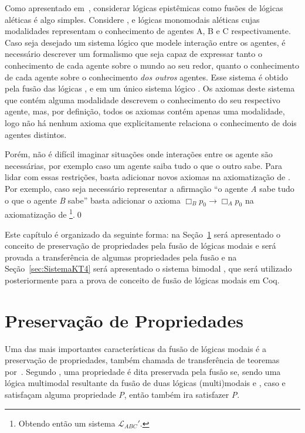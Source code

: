     \begin{exemplo}
        Como apresentado em~, considerar lógicas epistêmicas como fusões de lógicas aléticas é algo simples. Considere
        ,  e  lógicas monomodais aléticas cujas modalidades representam o conhecimento de agentes
        A, B e C respectivamente. Caso seja desejado um sistema lógico que modele interação entre os agentes, é necessário descrever um
        formalismo que seja capaz de expressar tanto o conhecimento de cada agente sobre o mundo ao seu redor, quanto o conhecimento de cada
        agente sobre o conhecimento \textit{dos outros} agentes. Esse sistema é obtido pela fusão das lógicas , 
        e  em um único sistema lógico . Os axiomas deste sistema que contém alguma modalidade descrevem o
        conhecimento do seu respectivo agente, mas, por definição, todos os axiomas contém apenas uma modalidade, logo não há nenhum
        axioma que explicitamente relaciona o conhecimento de dois agentes distintos.

        Porém, não é difícil imaginar situações onde interações entre os agente são necessárias, por exemplo caso um agente saiba tudo o que o
        outro sabe. Para lidar com essas restrições, basta adicionar novos axiomas na axiomatização de . Por exemplo,
        caso seja necessário representar a afirmação ``o agente \textit{A} sabe tudo o que o agente \textit{B} sabe'' basta adicionar o axioma
        \(\Box_B p_0 \to \Box_A p_0\) na axiomatização de \footnote{Obtendo então um sistema \(\mathcal{L}_{ABC}'\).}.\qed
    \end{exemplo}

    Este capítulo é organizado da seguinte forma: na Seção~\ref{sec:Preservacao} será apresentado o conceito de preservação de propriedades pela fusão de lógicas modais
    e será provada a transferência de algumas propriedades pela fusão e na Seção~\ref{sec:SistemaKT4} será apresentado o sistema bimodal \SisT, que será utilizado
    posteriormente para a prova de conceito de fusão de lógicas modais em Coq.

    \section{Preservação de Propriedades}
        \label{sec:Preservacao}
        Uma das mais importantes características da fusão de lógicas modais é a preservação de propriedades, também chamada de transferência de teoremas
        por~\cite{fine1996transfer}. Segundo \cite{kracht1991properties}, uma propriedade é dita preservada pela fusão se, sendo 
        uma lógica multimodal resultante da fusão de duas lógicas (multi)modais  e , caso  e 
        satisfaçam alguma propriedade \textit{P}, então  também ira satisfazer \textit{P}.

